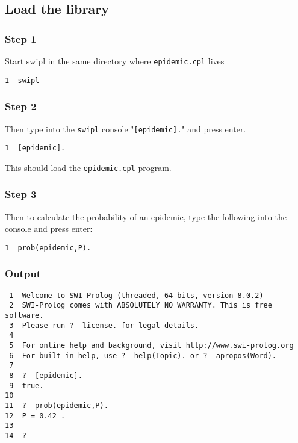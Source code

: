 \documentclass[11pt]{article}
\begin{document}
\subsection{Load the library}
\label{sec:org5d29b97}

\subsubsection{Step 1}
\label{sec:orgb17d410}
Start swipl in the same directory where \texttt{epidemic.cpl} lives

\begin{verbatim}
1  swipl
\end{verbatim}

\subsubsection{Step 2}
\label{sec:org0f103bf}
Then type into the \texttt{swipl} console "\texttt{[epidemic].}" and press enter.

\begin{verbatim}
1  [epidemic].
\end{verbatim}

This should load the \texttt{epidemic.cpl} program.

\subsubsection{Step 3}
\label{sec:orgf88e77b}

Then to calculate the probability of an epidemic, type the following into the console and press enter:

\begin{verbatim}
1  prob(epidemic,P).
\end{verbatim}

\subsubsection{Output}
\label{sec:orgb593156}
\begin{verbatim}
 1  Welcome to SWI-Prolog (threaded, 64 bits, version 8.0.2)
 2  SWI-Prolog comes with ABSOLUTELY NO WARRANTY. This is free software.
 3  Please run ?- license. for legal details.
 4  
 5  For online help and background, visit http://www.swi-prolog.org
 6  For built-in help, use ?- help(Topic). or ?- apropos(Word).
 7  
 8  ?- [epidemic].
 9  true.
10  
11  ?- prob(epidemic,P).
12  P = 0.42 .
13  
14  ?-
\end{verbatim}
\end{document}

